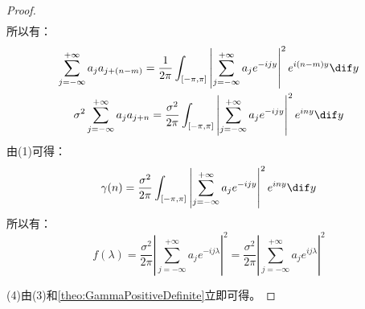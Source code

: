 \begin{proof}
\begin{align*}
	\end{align*}
	所以有：
	\begin{gather*}
		\sum_{j=-\infty}^{+\infty}a_ja_{j+(n-m)}=\frac{1}{2\pi}\int_{[-\pi,\pi]}\left|\sum_{j=-\infty}^{+\infty}a_je^{-ijy}\right|^2e^{i(n-m)y}\dif y \\
		\sigma^2\sum_{j=-\infty}^{+\infty}a_ja_{j+n}=\frac{\sigma^2}{2\pi}\int_{[-\pi,\pi]}\left|\sum_{j=-\infty}^{+\infty}a_je^{-ijy}\right|^2e^{iny}\dif y
	\end{gather*}
	由(1)可得：
	\begin{equation*}
		\gamma(n)=\frac{\sigma^2}{2\pi}\int_{[-\pi,\pi]}\left|\sum_{j=-\infty}^{+\infty}a_je^{-ijy}\right|^2e^{iny}\dif y
	\end{equation*}
	所以有：
	\begin{equation*}
		f(\lambda)=\frac{\sigma^2}{2\pi}\left|\sum_{j=-\infty}^{+\infty}a_je^{-ij\lambda}\right|^2=\frac{\sigma^2}{2\pi}\left|\sum_{j=-\infty}^{+\infty}a_je^{ij\lambda}\right|^2
	\end{equation*}\par
	(4)由(3)和\cref{theo:GammaPositiveDefinite}立即可得。
\end{proof}









